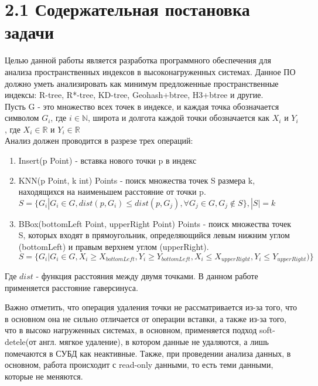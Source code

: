 \label{cha:statement}

\section{2.1 Содержательная постановка задачи}

Целью данной работы является разработка программного обеспечения для анализа пространственных индексов в высоконагруженных системах. Данное ПО должно уметь анализировать как минимум предложенные пространственные индексы: R-tree, R*-tree, KD-tree, Geohash+btree, H3+btree и другие.\\
Пусть G - это множество всех точек в индексе, и каждая точка обозначается символом $G_i$, где $i \in \mathbb{N}$, широта и долгота каждой точки обозначается как $X_i$ и $Y_i$, где $X_i \in \mathbb{R}$ и $Y_i \in \mathbb{R}$\\
Анализ должен проводится в разрезе трех операций:
\begin{enumerate}
    \item  Insert(p Point) - вставка нового точки p в индекс
    \item  KNN(p Point, k int) Points -  поиск множества точек S размера k, находящихся на наименьшем расстояние от точки p. $S=\{G_i | G_i \in G, dist(p, G_i) \leq dist(p, G_j),  \forall G_j \in G, G_j \notin S \}, |S| = k$
    \item  BBox(bottomLeft Point, upperRight Point) Points - поиск множества точек S, которых входят в прямоугольник, определяющийся левым нижним углом (bottomLeft) и правым верхнем углом (upperRight). $S=\{G_i | G_i \in G, X_i \geq X_{bottomLeft}, Y_i \geq Y_{bottomLeft}, X_i \leq X_{upperRight}, Y_i \leq Y_{upperRight} )\}$
\end{enumerate}
Где $dist$ - функция расстояния между двумя точками. В данном работе применяется расстояние гаверсинуса. 

Важно отметить, что операция удаления точки не рассматривается из-за того, что в основном она не сильно отличается от операции вставки\cite{bayerIndices}, а также из-за того, что в высоко нагруженных системах, в основном, применяется подход soft-detele(от англ. мягкое удаление), в котором данные не удаляются, а лишь помечаются в СУБД как неактивные. Также, при проведении анализа данных, в основном, работа происходит с read-only данными, то есть теми данными, которые не меняются. 

